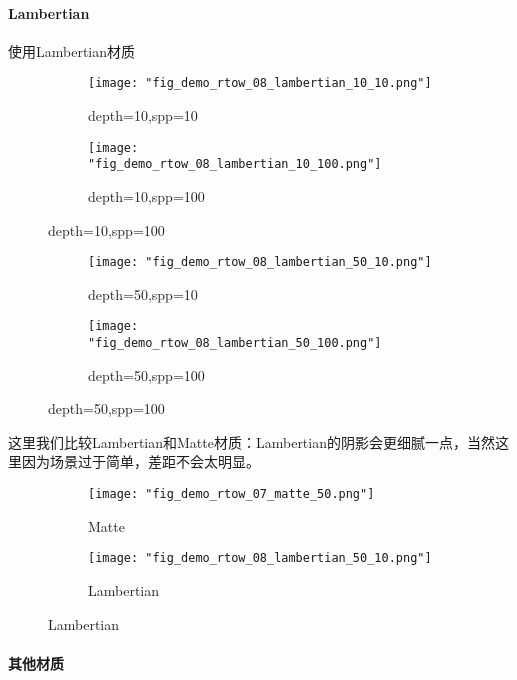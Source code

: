 \paragraph{Lambertian}

使用Lambertian材质




\begin{figure}[H]
    \centering
    \begin{subfigure}{0.25\linewidth}
        \texttt{[image: "fig\_demo\_rtow\_08\_lambertian\_10\_10.png"]}
        \caption{depth=10,spp=10}
    \end{subfigure}
    \begin{subfigure}{0.25\linewidth}
        \texttt{[image: "fig\_demo\_rtow\_08\_lambertian\_10\_100.png"]}
        \caption{depth=10,spp=100}
    \end{subfigure}
\end{figure}
\begin{figure}[H]
    \centering
    \begin{subfigure}{0.25\linewidth}
        \texttt{[image: "fig\_demo\_rtow\_08\_lambertian\_50\_10.png"]}
        \caption{depth=50,spp=10}
    \end{subfigure}
    \begin{subfigure}{0.25\linewidth}
        \texttt{[image: "fig\_demo\_rtow\_08\_lambertian\_50\_100.png"]}
        \caption{depth=50,spp=100}
    \end{subfigure}
\end{figure}

这里我们比较Lambertian和Matte材质：Lambertian的阴影会更细腻一点，当然这里因为场景过于简单，差距不会太明显。

\begin{figure}[H]
    \centering
    \begin{subfigure}{0.48\linewidth}
        \texttt{[image: "fig\_demo\_rtow\_07\_matte\_50.png"]}
        \caption{Matte}
    \end{subfigure}
    \begin{subfigure}{0.48\linewidth}
        \texttt{[image: "fig\_demo\_rtow\_08\_lambertian\_50\_10.png"]}
        \caption{Lambertian}
    \end{subfigure}
\end{figure}

\paragraph{其他材质}


